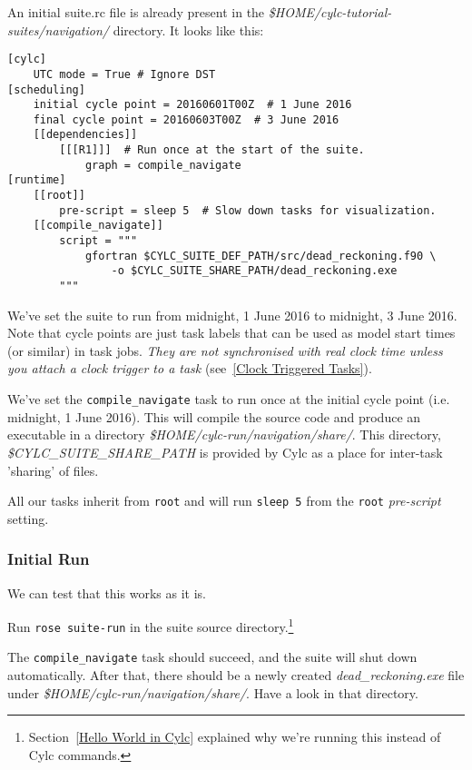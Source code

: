 An initial suite.rc file is already present in the {\em \$HOME/cylc-tutorial-suites/navigation/} directory.
It looks like this:

\lstset{language=suiterc}
\begin{lstlisting}[columns=fullflexible]
[cylc]
    UTC mode = True # Ignore DST
[scheduling]
    initial cycle point = 20160601T00Z  # 1 June 2016
    final cycle point = 20160603T00Z  # 3 June 2016
    [[dependencies]]
        [[[R1]]]  # Run once at the start of the suite.
            graph = compile_navigate
[runtime]
    [[root]]
        pre-script = sleep 5  # Slow down tasks for visualization.
    [[compile_navigate]]
        script = """
            gfortran $CYLC_SUITE_DEF_PATH/src/dead_reckoning.f90 \
                -o $CYLC_SUITE_SHARE_PATH/dead_reckoning.exe
        """
\end{lstlisting}

    We've set the suite to run from midnight, 1 June 2016 to midnight, 3 June
    2016. Note that cycle points are just task labels that can be used as
    model start times (or similar) in task jobs. {\em They are not synchronised
    with real clock time unless you attach a clock trigger to a task}
    (see~\ref{Clock Triggered Tasks}).
 
    We've set the \lstinline{compile_navigate} task to run once at the initial cycle point (i.e. midnight, 1 June 2016). This will compile the source code and produce an executable in a directory {\em \$HOME/cylc-run/navigation/share/}. This directory, {\em \$CYLC\_SUITE\_SHARE\_PATH} is provided by Cylc as a place for inter-task 'sharing' of files.

    All our tasks inherit from \lstinline{root} and will run \lstinline{sleep 5} from the \lstinline{root} {\em pre-script} setting.

\subsubsection{Initial Run}

    We can test that this works as it is.
    
    Run \lstinline{rose suite-run} in the suite source directory.\footnote {Section~\ref{Hello World in Cylc} explained why we're running this instead of Cylc commands.}
    
    The \lstinline{compile_navigate} task should succeed, and the suite will shut down automatically. After that, there should be a newly created {\em dead\_reckoning.exe} file under {\em \$HOME/cylc-run/navigation/share/}. Have a look in that directory.


